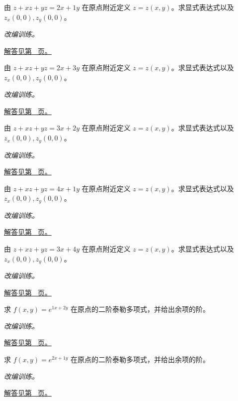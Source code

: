 \documentclass[12pt,fontset=fandol]{ctexart}
\begin{document}
\begin{example}[隐函数的一阶偏导]\label{ex:c33q14}
由 $z+xz+yz=2x+1y$ 在原点附近定义 $z=z(x,y)$。求显式表达式以及 $z_x(0,0),z_y(0,0)$。
\par\textit{改编训练。}\par\hyperref[ans:c33q14]{解答见第~\pageref{ans:c33q14} 页。}
\end{example}
\begin{example}[隐函数的一阶偏导]\label{ex:c33q15}
由 $z+xz+yz=2x+3y$ 在原点附近定义 $z=z(x,y)$。求显式表达式以及 $z_x(0,0),z_y(0,0)$。
\par\textit{改编训练。}\par\hyperref[ans:c33q15]{解答见第~\pageref{ans:c33q15} 页。}
\end{example}
\begin{example}[隐函数的一阶偏导]\label{ex:c33q16}
由 $z+xz+yz=3x+2y$ 在原点附近定义 $z=z(x,y)$。求显式表达式以及 $z_x(0,0),z_y(0,0)$。
\par\textit{改编训练。}\par\hyperref[ans:c33q16]{解答见第~\pageref{ans:c33q16} 页。}
\end{example}
\begin{example}[隐函数的一阶偏导]\label{ex:c33q17}
由 $z+xz+yz=4x+1y$ 在原点附近定义 $z=z(x,y)$。求显式表达式以及 $z_x(0,0),z_y(0,0)$。
\par\textit{改编训练。}\par\hyperref[ans:c33q17]{解答见第~\pageref{ans:c33q17} 页。}
\end{example}
\begin{example}[隐函数的一阶偏导]\label{ex:c33q18}
由 $z+xz+yz=3x+4y$ 在原点附近定义 $z=z(x,y)$。求显式表达式以及 $z_x(0,0),z_y(0,0)$。
\par\textit{改编训练。}\par\hyperref[ans:c33q18]{解答见第~\pageref{ans:c33q18} 页。}
\end{example}
\begin{example}[二元函数的二阶泰勒式]\label{ex:c33q19}
求 $f(x,y)=e^{1x+2y}$ 在原点的二阶泰勒多项式，并给出余项的阶。
\par\textit{改编训练。}\par\hyperref[ans:c33q19]{解答见第~\pageref{ans:c33q19} 页。}
\end{example}
\begin{example}[二元函数的二阶泰勒式]\label{ex:c33q20}
求 $f(x,y)=e^{2x+1y}$ 在原点的二阶泰勒多项式，并给出余项的阶。
\par\textit{改编训练。}\par\hyperref[ans:c33q20]{解答见第~\pageref{ans:c33q20} 页。}
\end{example}
\end{document}
